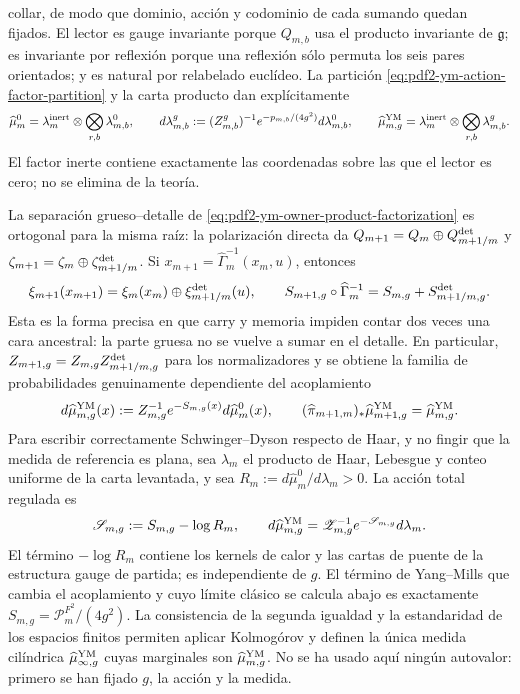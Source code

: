 collar, de modo que dominio, acción y codominio de cada sumando quedan fijados.
El lector es gauge invariante porque $Q_{m,b}$ usa el producto invariante de
$\mathfrak g$; es invariante por reflexión porque una reflexión sólo permuta los
seis pares orientados; y es natural por relabelado euclídeo.
La partición \eqref{eq:pdf2-ym-action-factor-partition} y la carta producto dan
explícitamente
\begin{equation}\label{eq:pdf2-ym-action-factor-measures}
 \widehat\mu_m^0=\lambda_m^{\rm inert}\otimes
   \bigotimes_{r,b}\lambda_{m,b}^0,
 \qquad
 d\lambda_{m,b}^g
 :=(Z_{m,b}^g)^{-1}e^{-p_{m,b}/(4g^2)}d\lambda_{m,b}^0,
 \qquad
 \widehat\mu_{m,g}^{\rm YM}=\lambda_m^{\rm inert}\otimes
   \bigotimes_{r,b}\lambda_{m,b}^g.
\end{equation}
El factor inerte contiene exactamente las coordenadas sobre las que el lector es
cero; no se elimina de la teoría.

La separación grueso--detalle de
\eqref{eq:pdf2-ym-owner-product-factorization} es ortogonal para la misma raíz:
la polarización directa da
$Q_{m+1}=Q_m\oplus Q_{m+1/m}^{\rm det}$ y
$\zeta_{m+1}=\zeta_m\oplus\zeta_{m+1/m}^{\rm det}$.
Si $x_{m+1}=\widehat\Gamma_m^{-1}(x_m,u)$, entonces
\begin{equation}\label{eq:pdf2-ym-action-cocycle}
 \xi_{m+1}(x_{m+1})
 =\xi_m(x_m)\oplus\xi_{m+1/m}^{\rm det}(u),
 \qquad
 S_{m+1,g}\circ\widehat\Gamma_m^{-1}
 =S_{m,g}+S_{m+1/m,g}^{\rm det}.
\end{equation}
Esta es la forma precisa en que carry y memoria impiden contar dos veces una cara
ancestral: la parte gruesa no se vuelve a sumar en el detalle. En particular,
$Z_{m+1,g}=Z_{m,g}Z_{m+1/m,g}^{\rm det}$ para los normalizadores y se obtiene la
familia de probabilidades genuinamente dependiente del acoplamiento
\begin{equation}\label{eq:pdf2-ym-gibbs-measure}
 d\widehat\mu_{m,g}^{\rm YM}(x)
 :=Z_{m,g}^{-1}e^{-S_{m,g}(x)}d\widehat\mu_m^0(x),
 \qquad
 (\widehat\pi_{m+1,m})_*\widehat\mu_{m+1,g}^{\rm YM}
 =\widehat\mu_{m,g}^{\rm YM}.
\end{equation}
Para escribir correctamente Schwinger--Dyson respecto de Haar, y no fingir que la
medida de referencia es plana, sea $\lambda_m$ el producto de Haar, Lebesgue y
conteo uniforme de la carta levantada, y sea
$R_m:=d\widehat\mu_m^0/d\lambda_m>0$. La acción total regulada es
\begin{equation}\label{eq:pdf2-ym-total-regulated-action}
 \mathscr S_{m,g}:=S_{m,g}-\log R_m,
 \qquad
 d\widehat\mu_{m,g}^{\rm YM}
 =\mathscr Z_{m,g}^{-1}e^{-\mathscr S_{m,g}}d\lambda_m.
\end{equation}
El término $-\log R_m$ contiene los kernels de calor y las cartas de puente de la
estructura gauge de partida; es independiente de $g$. El término de Yang--Mills que
cambia el acoplamiento y cuyo límite clásico se calcula abajo es exactamente
$S_{m,g}=\mathcal P_m^{F^2}/(4g^2)$.
La consistencia de la segunda igualdad y la estandaridad de los espacios finitos
permiten aplicar Kolmogórov y definen la única medida cilíndrica
$\widehat\mu_{\infty,g}^{\rm YM}$ cuyas marginales son
$\widehat\mu_{m,g}^{\rm YM}$.
No se ha usado aquí ningún autovalor: primero se han fijado $g$, la acción y
la medida.

